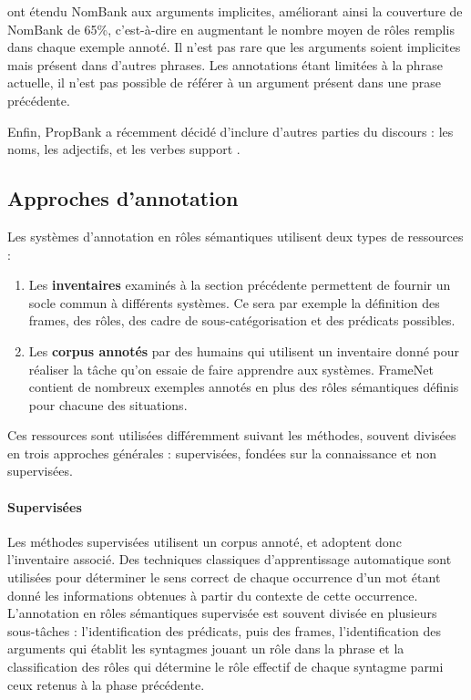 \cite{gerber2010beyond} ont étendu NomBank aux arguments
implicites, améliorant ainsi la couverture de NomBank de 65\%, c'est-à-dire en
augmentant le nombre moyen de rôles remplis dans chaque exemple annoté. Il
n'est pas rare que les arguments soient implicites mais présent dans d'autres
phrases. Les annotations étant limitées à la phrase actuelle, il n'est pas
possible de référer à un argument présent dans une prase précédente.

Enfin, PropBank a récemment décidé d'inclure d'autres parties du discours : les
noms, les adjectifs, et les verbes support \citep{bonial2014propbank}.

\subsection{Approches d'annotation}

Les systèmes d'annotation en rôles sémantiques utilisent deux types de
ressources :

\begin{enumerate}
    \item Les \textbf{inventaires} examinés à la section précédente permettent
        de fournir un socle commun à différents systèmes. Ce sera par exemple
        la définition des frames, des rôles, des cadre de sous-catégorisation
        et des prédicats possibles.
    \item Les \textbf{corpus annotés} par des humains qui utilisent un
        inventaire donné pour réaliser la tâche qu'on essaie de faire apprendre
        aux systèmes. FrameNet contient de nombreux exemples annotés en plus
        des rôles sémantiques définis pour chacune des situations.
\end{enumerate}

Ces ressources sont utilisées différemment suivant les méthodes, souvent
divisées en trois approches générales : supervisées, fondées sur la
connaissance et non supervisées.

\paragraph{Supervisées}

Les méthodes supervisées
\citep{gildea2002automatic,surdeanu2008conll,das2014frame,hermann2014semantic}
utilisent un corpus annoté, et adoptent donc l'inventaire associé. Des
techniques classiques d'apprentissage automatique sont utilisées pour
déterminer le sens correct de chaque occurrence d'un mot étant donné les
informations obtenues à partir du contexte de cette occurrence.  L'annotation
en rôles sémantiques supervisée est souvent divisée en plusieurs sous-tâches :
l'identification des prédicats, puis des frames, l'identification des arguments
qui établit les syntagmes jouant un rôle dans la phrase et la classification
des rôles qui détermine le rôle effectif de chaque syntagme parmi ceux retenus
à la phase précédente.


